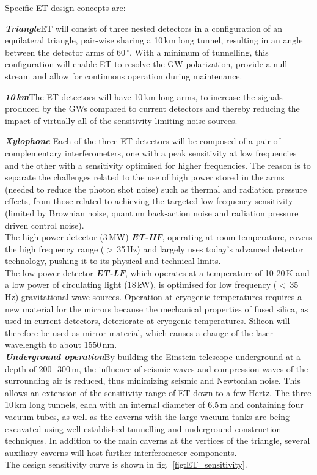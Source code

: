 \documentclass[graybox, nosecnum]{svmult}
\begin{document}

\noindent Specific ET design concepts are: 

\textbf{\textit{Triangle}}\quad ET will consist of three nested detectors in a configuration of an equilateral triangle, pair-wise sharing a 10\,km long tunnel, resulting in an angle between the detector arms of $60\,^\circ$. With a minimum of tunnelling, this configuration will enable ET to resolve the GW polarization, provide a null stream  and allow for continuous operation during maintenance.

\textbf{\textit{10\,km}}\quad The ET detectors will have 10\,km long arms, to increase the signals produced by the GWs compared to current detectors and thereby reducing the impact of virtually all of the sensitivity-limiting noise sources.
  
\textbf{\textit{Xylophone}}\quad 
Each of the three ET detectors will be composed of a pair of complementary interferometers, one with a peak sensitivity at low frequencies and the other with a sensitivity optimised for higher frequencies. 
The reason is to separate the challenges related to the use of high power stored in the arms (needed to reduce the photon shot noise) such as thermal and radiation pressure effects, from those related to achieving the targeted low-frequency sensitivity (limited by Brownian noise, quantum back-action noise and radiation pressure driven control noise).\\
The high power detector (3\,MW) \textbf{\textit{ET-HF}}, operating at room temperature, covers the high frequency range ($>$\,35\,Hz) and largely uses today's advanced detector technology, pushing it to its physical and technical limits.\\
The low power detector \textbf{\textit{ET-LF}}, which operates at a temperature of 10-20\,K and a low power of circulating light (18\,kW), is optimised for low frequency ($<$\,35\,Hz) gravitational wave sources. Operation at cryogenic temperatures requires a new material for the mirrors because the mechanical properties of fused silica, as used in current detectors, deteriorate at cryogenic temperatures. Silicon will therefore be used as mirror material, which causes a change of the laser wavelength to about 1550\,nm.\\
\textbf{\textit{Underground operation}}\quad By building the Einstein telescope underground at a depth of 200\,-\,300\,m, the influence of seismic waves and compression waves of the surrounding air is reduced, thus minimizing seismic and Newtonian noise.
This allows an extension of the sensitivity range of ET down to a few Hertz. 
The three 10\,km long tunnels, each with an internal diameter of 6.5\,m and containing four vacuum tubes, as well as the caverns with the large vacuum tanks are being excavated using well-established tunnelling and underground construction techniques. 
In addition to the main caverns at the vertices of the triangle, several auxiliary caverns will host further interferometer components. \\
The design sensitivity curve is shown in fig.~\ref{fig:ET_sensitivity}.
\end{document}
